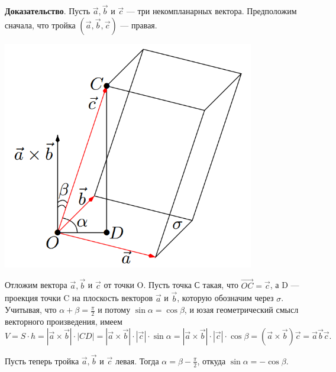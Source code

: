 \documentclass[a4paper]{article}
\begin{document}
    \begin{hproof}
        \textbf{Доказательство}. Пусть $\vec{a}, \vec{b}$ и $\vec{c}$ --- три некомпланарных вектора. Предположим сначала, что тройка $(\vec{a}, \vec{b}, \vec{c})$ --- правая.

        \includegraphics[width=11cm]{t4}


        Отложим вектора $\vec{a}, \vec{b}$ и $\vec{c}$ от точки O. Пусть точка С такая, что $\overrightarrow{OC} = \vec{c}$, а D --- проекция точки C на плоскость векторов $\vec{a}$ и $\vec{b}$, которую обозначим через $\sigma$. Учитывая, что $\alpha + \beta = \frac{\pi}{2}$ и потому $\sin \alpha = \cos \beta$, и юзая геометрический смысл векторного произведения, имеем
        \begin{equation}
            V = S \cdot h =  | \vec{a} \times \vec{b} | \cdot | CD | = |\vec{a} \times \vec{b}| \cdot | \vec{c} | \cdot \sin \alpha = |\vec{a} \times \vec{b}| \cdot | \vec{c} | \cdot \cos \beta = ( \vec{a} \times \vec{b}) \vec{c} = \vec{a} \vec{b} \vec{c}.
        \end{equation}

        Пусть теперь тройка $\vec{a}, \vec{b}$ и $\vec{c}$ левая. Тогда $\alpha = \beta - \frac{\pi}{2}$, откуда $\sin \alpha = - \cos \beta$.


\end{hproof}
\end{document}
